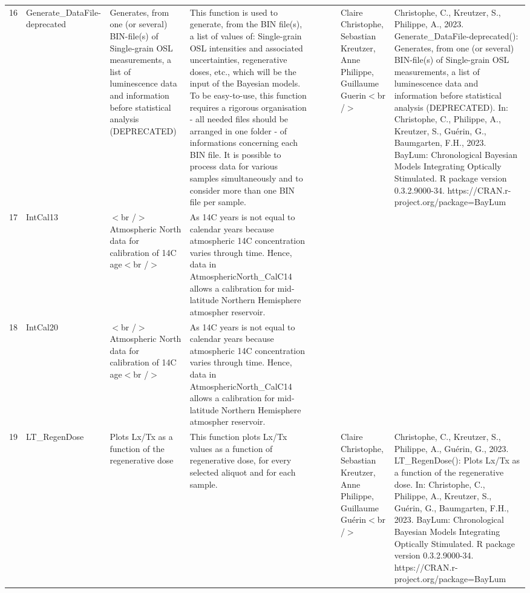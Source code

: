 \begin{table}[ht]
\begin{tabular}{rllllllll}
  16 & Generate\_DataFile-deprecated & Generates, from one (or several) BIN-file(s) of Single-grain OSL measurements, a list of luminescence data and information before statistical analysis (DEPRECATED) & This function is used to generate, from the BIN file(s), a list of values of: Single-grain  OSL intensities and associated uncertainties, regenerative doses, etc., which will be the input of the Bayesian models. To be easy-to-use, this function requires a rigorous organisation - all needed files should be arranged in one folder - of informations concerning each BIN file.   It is possible to process data for various samples simultaneously and to consider more than one BIN file per sample. &  &  &  & Claire Christophe, Sebastian Kreutzer, Anne Philippe, Guillaume Guerin$<$br /$>$ & Christophe, C., Kreutzer, S., Philippe, A., 2023. Generate\_DataFile-deprecated(): Generates, from one (or several) BIN-file(s) of Single-grain OSL measurements, a list of luminescence data and information before statistical analysis (DEPRECATED). In: Christophe, C., Philippe, A., Kreutzer, S., Guérin, G., Baumgarten, F.H., 2023. BayLum: Chronological Bayesian Models Integrating Optically Stimulated. R package version 0.3.2.9000-34. https://CRAN.r-project.org/package=BayLum
 \\ 
  17 & IntCal13 & $<$br /$>$ Atmospheric North data for calibration of 14C age$<$br /$>$ & As 14C years is not equal to calendar years because atmospheric 14C concentration varies through time. Hence, data in AtmosphericNorth\_CalC14 allows a calibration for mid-latitude Northern Hemisphere atmospher reservoir. &  &  &  &  &  \\ 
  18 & IntCal20 & $<$br /$>$ Atmospheric North data for calibration of 14C age$<$br /$>$ & As 14C years is not equal to calendar years because atmospheric 14C concentration varies through time. Hence, data in AtmosphericNorth\_CalC14 allows a calibration for mid-latitude Northern Hemisphere atmospher reservoir. &  &  &  &  &  \\ 
  19 & LT\_RegenDose & Plots Lx/Tx as a function of the regenerative dose & This function plots  Lx/Tx  values as a function of regenerative dose, for every selected aliquot and for each sample. &  &  &  & Claire Christophe, Sebastian Kreutzer, Anne Philippe, Guillaume Guérin$<$br /$>$ & Christophe, C., Kreutzer, S., Philippe, A., Guérin, G., 2023. LT\_RegenDose(): Plots Lx/Tx as a function of the regenerative dose. In: Christophe, C., Philippe, A., Kreutzer, S., Guérin, G., Baumgarten, F.H., 2023. BayLum: Chronological Bayesian Models Integrating Optically Stimulated. R package version 0.3.2.9000-34. https://CRAN.r-project.org/package=BayLum

\end{tabular}
\end{table}
